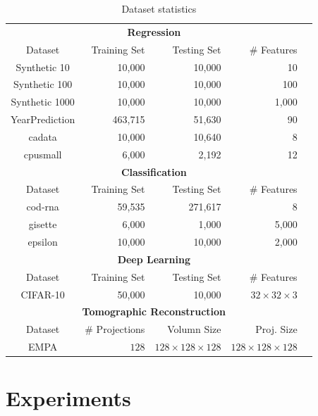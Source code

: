 \documentclass{article}
\begin{document}
\begin{table}[t]
\tiny
\centering
\begin{tabular}{crrrr}
\hline
\multicolumn{4}{c}{\bf Regression}\\
Dataset           & Training Set & Testing Set & \# Features  \\
\hline
Synthetic 10   & 10,000        & 10,000       & 10               \\
Synthetic 100  & 10,000        & 10,000       & 100              \\
Synthetic 1000 & 10,000        & 10,000       & 1,000           \\
YearPrediction & 463,715       & 51,630       & 90                  \\
cadata         & 10,000        & 10,640       & 8                   \\
cpusmall       & 6,000         & 2,192        & 12     \\
\hline
\hline
\multicolumn{4}{c}{\bf Classification}\\
Dataset           & Training Set & Testing Set & \# Features \\
\hline
cod-rna        & 59,535        & 271,617      & 8    \\
gisette        & 6,000         & 1,000        & 5,000  \\  
epsilon        & 10,000        & 10,000       & 2,000\\  
\hline
\hline
\multicolumn{4}{c}{\bf Deep Learning}\\
Dataset           & Training Set & Testing Set & \# Features \\
\hline
CIFAR-10        & 50,000        & 10,000      &$32\times 32\times 3$     \\
\hline
\hline
\multicolumn{4}{c}{\bf Tomographic Reconstruction}\\
Dataset           & \# Projections & Volumn Size & Proj. Size \\
\hline
EMPA              & $128$            & $128\times 128\times 128$      & $128\times 128\times 128$     \\
\hline
\end{tabular}
\vspace{-1em}
\caption{Dataset statistics}
\vspace{-1.5em}
\label{table:dataset}
\end{table}

\vspace{-0.5em}
\section{Experiments} \label{sec:exp}
\end{document}
